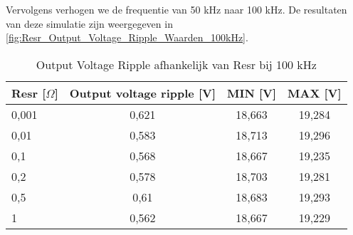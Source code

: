 Vervolgens verhogen we de frequentie van 50 kHz naar 100 kHz. De resultaten van deze simulatie zijn weergegeven in \autoref{fig:Resr_Output_Voltage_Ripple_Waarden_100kHz}.
\begin{table}[h!]
\centering
\begin{tabular}{|l|c|c|c|}
\hline
\textbf{Resr [\(\Omega\)]} & \textbf{Output voltage ripple [V]} & \textbf{MIN [V]} & \textbf{MAX [V]} \\
\hline
0,001  & 0,621  & 18,663  & 19,284 \\
0,01   & 0,583  & 18,713  & 19,296 \\
0,1    & 0,568  & 18,667  & 19,235 \\
0,2    & 0,578  & 18,703  & 19,281 \\
0,5    & 0,61   & 18,683  & 19,293 \\
1      & 0,562  & 18,667  & 19,229 \\
\hline
\end{tabular}
\caption{Output Voltage Ripple afhankelijk van Resr bij 100 kHz}
\label{fig:Resr_Output_Voltage_Ripple_Waarden_100kHz}
\end{table}